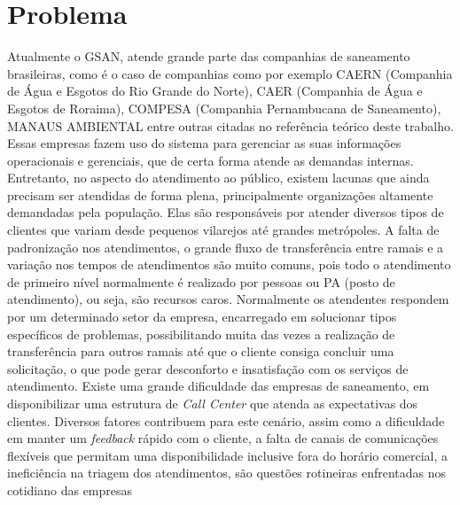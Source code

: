 \section*{Problema}

Atualmente o GSAN, atende grande parte das companhias de saneamento brasileiras, como é o caso de companhias como por exemplo CAERN (Companhia de Água e Esgotos do Rio Grande do Norte), CAER (Companhia de Água e Esgotos de Roraima), COMPESA (Companhia Pernambucana de Saneamento), MANAUS AMBIENTAL entre outras citadas no referência teórico deste trabalho. Essas empresas fazem uso do sistema para gerenciar as suas informações operacionais e gerenciais, que de certa forma atende as demandas internas. Entretanto, no aspecto do atendimento ao público, existem lacunas que ainda precisam ser atendidas de forma plena, principalmente organizações altamente demandadas pela população. Elas são responsáveis por atender diversos tipos de clientes que variam desde pequenos vilarejos até grandes metrópoles.
A falta de padronização nos atendimentos, o grande fluxo de transferência entre ramais e a variação nos tempos de atendimentos são muito comuns, pois todo o atendimento de primeiro nível normalmente é realizado por pessoas ou PA (posto de atendimento), ou seja, são recursos caros. Normalmente os atendentes respondem por um determinado setor da empresa, encarregado em solucionar tipos específicos de problemas, possibilitando muita das vezes a realização de transferência para outros ramais até que o cliente consiga concluir uma solicitação, o que pode gerar desconforto e insatisfação com os serviços de atendimento.	
Existe uma grande dificuldade das empresas de saneamento, em disponibilizar uma estrutura de \textit{Call Center} que atenda as expectativas dos clientes. Diversos fatores contribuem para este cenário, assim como a dificuldade em manter um \textit{feedback} rápido com o cliente, a falta de canais de comunicações flexíveis que permitam uma disponibilidade inclusive fora do horário comercial, a ineficiência na triagem dos atendimentos, são questões rotineiras enfrentadas nos cotidiano das empresas
